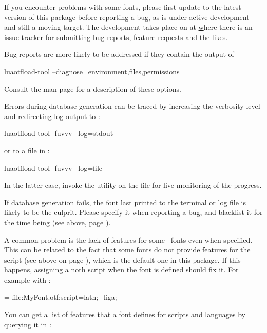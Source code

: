 
If you encounter problems with some fonts, please first update to the
latest version of this package before reporting a bug, as
 is under active development and still a moving
target.
%
The development takes place on  at
\hyperlink {https://github.com/lualatex/luaotfload} where there is an issue
tracker for submitting bug reports, feature requests and the likes.

Bug reports are more likely to be addressed if they contain the output
of

\beginlisting
    luaotfload-tool --diagnose=environment,files,permissions
\endlisting

\noindent Consult the man page for a description of these options.

Errors during database generation can be traced by increasing the
verbosity level and redirecting log output to :

\beginlisting
    luaotfload-tool -fuvvv --log=stdout
\endlisting

\noindent or to a file in :

\beginlisting
    luaotfload-tool -fuvvv --log=file
\endlisting

\noindent In the latter case, invoke the  utility on the
file for live monitoring of the progress.

If database generation fails, the font last printed to the terminal or
log file is likely to be the culprit.
%
Please specify it when reporting a bug, and blacklist it for the time
being (see above, page \pageref{font-blacklist}).

\endsubsection


A common problem is the lack of features for some
\OpenType\ fonts even when specified.
%
This can be related to the fact that some fonts do not provide features
for the  script (see above on page \pageref{script-tag}),
which is the default one in this package.
%
If this happens, assigning a noth script when the font is defined should
fix it.
%
For example with :

\beginlisting
    \font \test = file:MyFont.otf:script=latn;+liga;
\endlisting

You can get a list of features that a font defines for scripts and
languages by querying it in :

